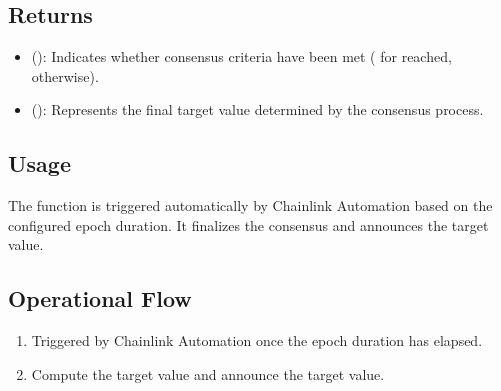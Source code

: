 \documentclass[a4paper,10pt,english]{sphinxmanual}
\begin{document}
\begin{sphinxVerbatim}[commandchars=\\\{\}]
\end{sphinxVerbatim}


\subsection{Returns}
\label{\detokenize{docs_consensus_mechanism_contract:returns}}\begin{itemize}
\item {} 
\sphinxAtStartPar
{} ():
Indicates whether consensus criteria have been met ( for reached,  otherwise).

\item {} 
\sphinxAtStartPar
{} ():
Represents the final target value determined by the consensus process.

\end{itemize}


\subsection{Usage}
\label{\detokenize{docs_consensus_mechanism_contract:id4}}
\sphinxAtStartPar
The function is triggered automatically by Chainlink Automation based on the configured epoch duration. It finalizes the consensus and announces the target value.


\subsection{Operational Flow}
\label{\detokenize{docs_consensus_mechanism_contract:id5}}\begin{enumerate}
%
\item {} 
\sphinxAtStartPar
{} Triggered by Chainlink Automation once the epoch duration has elapsed.

\item {} 
\sphinxAtStartPar
{} Compute the target value and announce the target value.

\end{enumerate}
\end{document}

